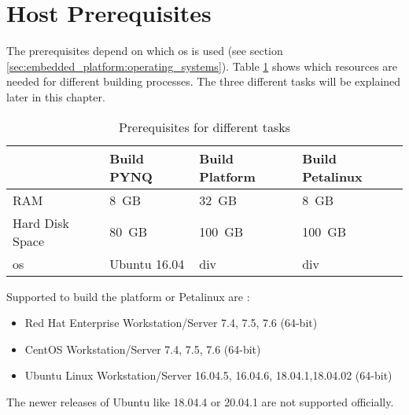 \section{Host Prerequisites}
\label{sec:embedded_platform:host_prerequisites}

The prerequisites depend on which \acrshort{os} is used (see section \ref{sec:embedded_platform:operating_systems}).
Table \ref{tab:prerequisits_hardware} shows which resources are needed for different building processes.
The three different tasks will be explained later in this chapter. 

\begin{table}[hb]
  \caption{Prerequisites for different tasks}
  \label{tab:prerequisits_hardware}
  \centering
  \begin{tabular}{llll} %
    \toprule
    \textbf{} & \textbf{Build PYNQ} \cite{avnet_pynq_github} & \textbf{Build Platform} \cite{vitis_user_guide} & \textbf{Build Petalinux} \cite{petalinux_user_guide} \\ %
    \midrule
    RAM & \SI{8}{GB} & \SI{32}{GB} & \SI{8}{GB} \\ %
    Hard Disk Space & \SI{80}{GB} & \SI{100}{GB} & \SI{100}{GB} \\ %
    \acrlong{os} & Ubuntu 16.04 & div & div \\ %
    \bottomrule
  \end{tabular}
\end{table}

Supported  to build the platform or Petalinux are \cite{vitis_user_guide, petalinux_user_guide}:
\begin{itemize}
  \item Red Hat Enterprise Workstation/Server 7.4, 7.5, 7.6 (64-bit)
  \item CentOS Workstation/Server 7.4, 7.5, 7.6 (64-bit)
  \item Ubuntu Linux Workstation/Server 16.04.5, 16.04.6, 18.04.1,18.04.02 (64-bit)
\end{itemize}
The newer releases of Ubuntu like 18.04.4 or 20.04.1 are not supported officially.
